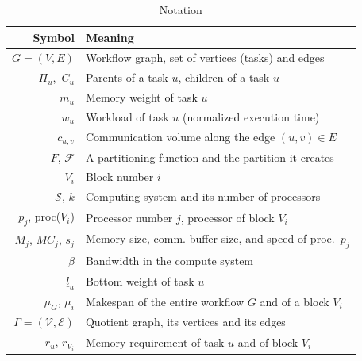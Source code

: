 \documentclass[conference]{IEEEtran}
\newcommand{\bottomlevel}[1]{\underline{l}_{#1}} %
\newcommand{\parents}[1]{\,\Pi_{#1}}
\newcommand{\children}[1]{\,C_{#1}}
\newcommand{\cluster}{\,\mathcal{S}}
\begin{document}
    \begin{table}
        \begin{center}
            \begin{tabular}{rl}
                \hline
                \textbf{Symbol}                       & \textbf{Meaning}                                         \\
                \hline
                $G = (V, E)$                          & Workflow graph, set of vertices (tasks) and edges        \\
                $\parents{u}$, $\children{u}$         & Parents of a task $u$, children of a task $u$            \\
                $m_u$                                 & Memory weight of task $u$                                \\
                $w_u$                                 & Workload of task $u$  (normalized execution time)          \\
                $c_{u,v}$                             & Communication volume along the edge $(u,v)\in E$         \\
                $F$, $\mathcal{F}$                    & A partitioning function and the partition it creates     \\
                $V_i$                                 & Block number $i$                                         \\ %
                $\cluster$, $k$                    & Computing system and its number of processors           \\
                $p_j$, proc($V_i$)                          & Processor number $j$, processor of block $V_i$                 \\
                $M_j$, $MC_j$, $s_j$                               & Memory size, comm. buffer size, and speed of proc.\ $p_j$                          \\
                $\beta$                     & Bandwidth in the compute system                                \\
                $\bottomlevel{u}$                      & Bottom weight of task $u$ \\
                $\mu_G$, $\mu_i$ & Makespan of the entire workflow $G$ and of a block $V_i$               \\
                $\Gamma = (\mathcal{V}, \mathcal{E})$                      & Quotient graph, its vertices and its edges        \\
                $r_u$, $r_{V_i}$                            & Memory requirement of task $u$ and of block $V_i$                 \\
                \hline
            \end{tabular}
        \end{center}
        \caption{Notation} \label{tabnotation}
    \end{table}
\end{document}
